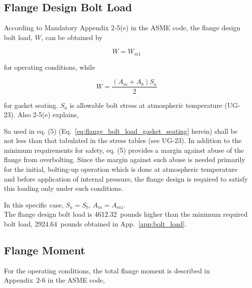 \subsection{Flange Design Bolt Load}
\label{app:flange_bolt_load}

According to Mandatory Appendix 2-5(e) in the ASME code,
the flange design bolt load, $W$, can be obtained by

\begin{equation}
    W = W_{m1}
\end{equation}

for operating conditions, while

\begin{equation}
    W = \frac{(A_m+A_b)S_a}{2}
\label{eq:flange_bolt_load_gasket_seating}
\end{equation}

for gasket seating.
$S_a$ is allowable bolt stress at atmospheric temperature (UG-23).
Also 2-5(e) explains,

\begin{displayquote}
    Sa used in eq. (5) (Eq.~\ref{eq:flange_bolt_load_gasket_seating} herein) 
    shall be not less than that tabulated in the stress tables (see UG-23). 
    In addition to the minimum requirements for safety, eq. (5) provides 
    a margin against abuse of the flange from overbolting. 
    Since the margin against such abuse is needed primarily for the initial, 
    bolting‐up operation which is done at atmospheric temperature and before 
    application of internal pressure, the flange design is required to satisfy 
    this loading only under such conditions.
\end{displayquote}

In this specific case, $S_a = S_b$, $A_m = A_{m1}$.\\

The flange design bolt load is 4612.32~pounds 
higher than the minimum required bolt load, 2924.64~pounds
obtained in App.~\ref{app:bolt_load}.

\subsection{Flange Moment}
\label{app:flange_moment}

For the operating conditions, the total flange moment is described
in Appendix~2-6 in the ASME code,

